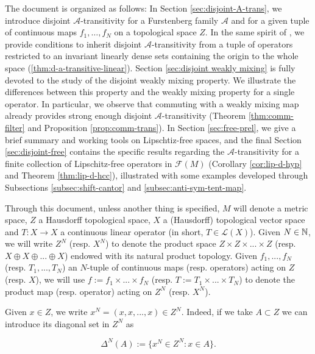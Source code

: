 \documentclass[11pt,reqno]{article}
\newcommand{\free}[1]{\mathcal{F}(#1)} %
\def\NN{\Bbb N}
\begin{document}
 The document is organized as follows: In Section \ref{sec:disjoint-A-trans}, we introduce disjoint $\mathcal{A}$-transitivity for a Furstenberg family $\mathcal{A}$ and for a given tuple of continuous maps $f_1,\dots,f_N$ on a topological space $Z$. In the same spirit of \cite{MuPe2015}, we provide conditions to inherit disjoint $\mathcal{A}$-transitivity from a tuple of operators restricted to an invariant linearly dense sets containing the origin to the whole space (\ref{thm:d-a-transitive-linear}). Section \ref{sec:disjoint weakly mixing} is fully devoted to the study of the disjoint weakly mixing property. We illustrate the differences between this property and the weakly mixing property for a single operator. In particular, we observe that commuting with a weakly mixing map already provides strong enough disjoint $\mathcal{A}$-transitivity (Theorem \ref{thm:comm-filter} and Proposition \ref{prop:comm-trans}). In Section \ref{sec:free-prel}, we give a brief summary and working tools on Lipschtiz-free spaces, and the final Section \ref{sec:disjoint-free} contains the specific results regarding the $\mathcal{A}$-transitivity for a finite collection of Lipschitz-free operators in $\free{M}$ (Corollary \ref{cor:lip-d-hyp} and Theorem \ref{thm:lip-d-hcc}), illustrated with some examples developed through Subsections \ref{subsec:shift-cantor} and \ref{subsec:anti-sym-tent-map}.



Through this document, unless another thing is specified, $M$ will denote a metric space, $Z$ a Hausdorff topological space,  $X$ a (Hausdorff) topological vector space and $T\colon X\to X$ a 
continuous linear operator (in short, $T\in \mathcal{L}(X)$). Given $N\in \NN$, we will write $Z^N$ (resp. $X^N$) to denote the product space 
$Z\times Z \times ...\times Z$ (resp. $X\oplus X \oplus...\oplus X$) endowed with its natural product 
topology. Given $f_1,...,f_N$ (resp. $T_1,...,T_N$) an $N$-tuple of continuous maps (resp. operators) 
acting on $Z$ (resp. $X$), we will use $f:=f_1\times...\times f_N$ (resp. $T:=T_1\times ...\times T_N$) 
to denote the product map (resp. operator) acting on $Z^N$ (resp. $X^N$).

Given $x\in Z$, we write $x^N=(x,x,...,x)\in Z^N$. Indeed, if we take $A\subset Z$ we can introduce its diagonal set in $Z^N$ as

\begin{equation*}
    \Delta^N(A) :=\{x^N \in Z^N : x\in A\}.
\end{equation*}
\end{document}

